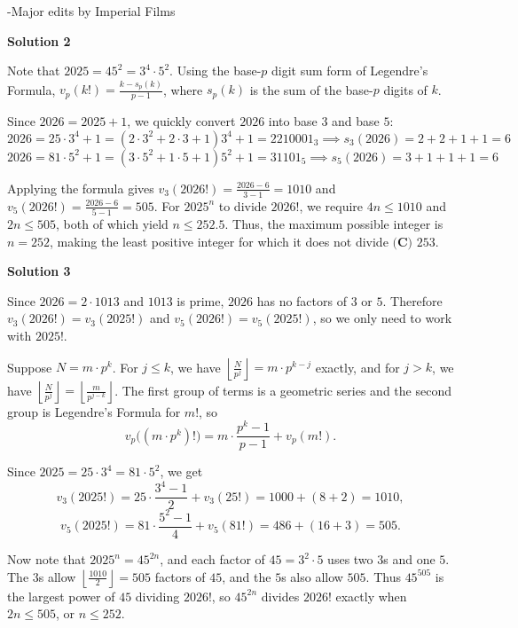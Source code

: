 \begin{enumerate}
 -Major edits by Imperial Films

 



\textbf{Solution 2}

Note that $2025 = 45^2 = 3^4 \cdot 5^2$. Using the base-$p$ digit sum form of Legendre's Formula, $v_p(k!) = \frac{k - s_p(k)}{p - 1}$, where $s_p(k)$ is the sum of the base-$p$ digits of $k$.

 Since $2026 = 2025 + 1$, we quickly convert $2026$ into base $3$ and base $5$:
 \[2026 = 25 \cdot 3^4 + 1 = (2 \cdot 3^2 + 2 \cdot 3 + 1)3^4 + 1 = 2210001_3 \implies s_3(2026) = 2+2+1+1 = 6\]
 \[2026 = 81 \cdot 5^2 + 1 = (3 \cdot 5^2 + 1 \cdot 5 + 1)5^2 + 1 = 31101_5 \implies s_5(2026) = 3+1+1+1 = 6\]

 Applying the formula gives $v_3(2026!) = \frac{2026 - 6}{3 - 1} = 1010$ and $v_5(2026!) = \frac{2026 - 6}{5 - 1} = 505$. For $2025^n$ to divide $2026!$, we require $4n \le 1010$ and $2n \le 505$, both of which yield $n \le 252.5$. Thus, the maximum possible integer is $n = 252$, making the least positive integer for which it does not divide $\boxed{\textbf{(C) }253}$.

 



\textbf{Solution 3}

Since $2026 = 2\cdot 1013$ and $1013$ is prime, $2026$ has no factors of $3$ or $5$. Therefore $v_3(2026!) = v_3(2025!)$ and $v_5(2026!) = v_5(2025!)$, so we only need to work with $2025!$.

 Suppose $N = m\cdot p^k$. For $j \le k$, we have $\left\lfloor \frac{N}{p^j} \right\rfloor = m\cdot p^{k-j}$ exactly, and for $j > k$, we have $\left\lfloor \frac{N}{p^j} \right\rfloor = \left\lfloor \frac{m}{p^{j-k}} \right\rfloor$. The first group of terms is a geometric series and the second group is Legendre's Formula for $m!$, so
 \[v_p\big((m\cdot p^k)!\big) = m\cdot\frac{p^k-1}{p-1} + v_p(m!).\]

 Since $2025 = 25\cdot 3^4 = 81\cdot 5^2$, we get
 \[v_3(2025!) = 25\cdot\frac{3^4-1}{2} + v_3(25!) = 1000 + (8+2) = 1010,\]
 \[v_5(2025!) = 81\cdot\frac{5^2-1}{4} + v_5(81!) = 486 + (16+3) = 505.\]

 Now note that $2025^n = 45^{2n}$, and each factor of $45 = 3^2\cdot 5$ uses two $3$s and one $5$. The $3$s allow $\left\lfloor \frac{1010}{2} \right\rfloor = 505$ factors of $45$, and the $5$s also allow $505$. Thus $45^{505}$ is the largest power of $45$ dividing $2026!$, so $45^{2n}$ divides $2026!$ exactly when $2n \le 505$, or $n \le 252$.


\end{enumerate}
